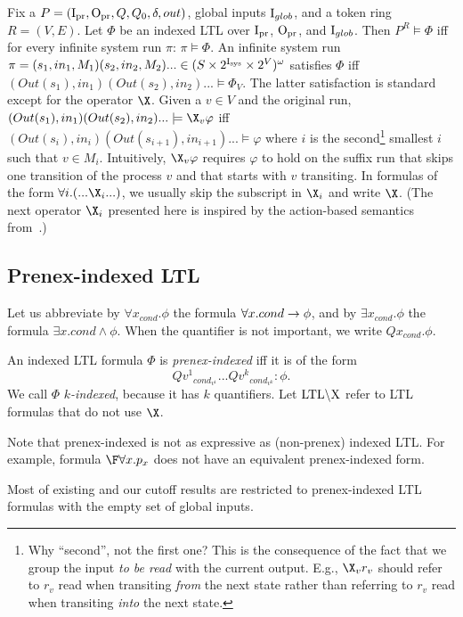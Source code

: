 Fix a $P=({\mathrm{I}_{\mathrm{pr}}},{\mathrm{O}_{\mathrm{pr}}},Q,Q_0,\delta,out)$,
global inputs $\mathrm{I}_{glob}$, and a token ring $R=(V,E)$.
Let $\Phi$ be an indexed LTL over ${\mathrm{I}_{\mathrm{pr}}}$, ${\mathrm{O}_{\mathrm{pr}}}$, and $\mathrm{I}_{glob}$.
Then $P^R \models \Phi$ iff for every infinite system run $\pi$: $\pi\models\Phi$.
An infinite system run $\pi=(s_1,in_1,M_1) (s_2, in_2, M_2) ... \in (S\times 2^{{\mathrm{I}_{\mathrm{sys}}}}\times 2^V)^\omega$
satisfies $\Phi$
iff
$(Out(s_1),in_1) (Out(s_2), in_2)... \models \Phi_V$.
The latter satisfaction is standard except for the operator $\X$.
Given a $v \in V$ and the original run,
$(Out(s_1),in_1) (Out(s_2), in_2)... \models \X_v \varphi$
iff
$(Out(s_i),in_i) (Out(s_{i+1}), in_{i+1})... \models \varphi$
where $i$ is the second\footnote{Why ``second'', not the first one?
  This is the consequence of the fact that we group the input \emph{to be read} with the current output.
  E.g., $\X_v r_v$ should refer to $r_v$ read when transiting \emph{from} the next state
  rather than referring to $r_v$ read when transiting \emph{into} the next state.}
  smallest $i$ such that $v \in M_i$.
Intuitively, $\X_v \varphi$ requires $\varphi$ to hold on the suffix run
that skips one transition of the process $v$ and that starts with $v$ transiting.
In formulas of the form $\forall i.(...\X_i...)$,
we usually skip the subscript in $\X_i$ and write $\X$.
(The next operator $\X_i$ presented here is inspired by the action-based semantics from~\cite{Emerso03}.)

\subsection*{Prenex-indexed LTL}

Let us abbreviate by $\forall x_{cond}.\phi$ the formula $\forall x.cond \rightarrow \phi$,
and by $\exists x_{cond}.\phi$ the formula $\exists x. cond \land \phi$.
When the quantifier is not important, we write $Q x_{cond}.\phi$.

An indexed LTL formula $\Phi$ is \emph{prenex-indexed} iff it is of the form
$$
Q {v^1}_{cond_{v^1}}...Q {v^k}_{cond_{v^k}}: \phi.
$$
We call $\Phi$ \emph{$k$-indexed}, because it has $k$ quantifiers.
Let $\text{LTL}\backslash\text{X}$ refer to LTL formulas that do not use $\X$.

Note that prenex-indexed \LTL is not as expressive as (non-prenex) indexed LTL.
For example, formula $\F\forall x. p_x$ does not have an equivalent prenex-indexed form.

Most of existing and our cutoff results are restricted to prenex-indexed LTL formulas
with the empty set of global inputs.

